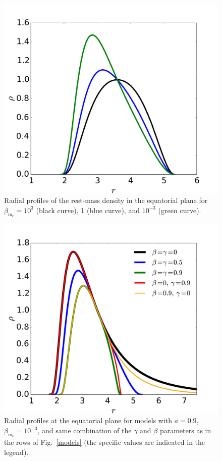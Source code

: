 \documentclass[referee]{aa}
\begin{document}
\begin{figure}[t]
\centering
\includegraphics[scale=0.2]{figures/fig4.pdf}
\caption{Radial profiles of the rest-mass density in the equatorial plane for {$\beta_{\mathrm{m}_{\mathrm{c}}}=10^3$} (black curve), 1 (blue curve), and $10^{-3}$ (green curve). }
\label{magnetisation-profile}
 \end{figure}
 
\begin{figure}[t]
\centering
\includegraphics[scale=0.2]{figures/fig5.pdf}
\caption{Radial profiles at the equatorial plane for models with $a=0.9$, $\beta_{\mathrm{m}_{\mathrm{c}}}
=10^{-3}$, and same combination of the $\gamma$ and $\beta$ parameters as in the rows of Fig.~\ref{models} (the specific values are indicated in the legend).}
\label{more-profile}
\end{figure}
\end{document}
